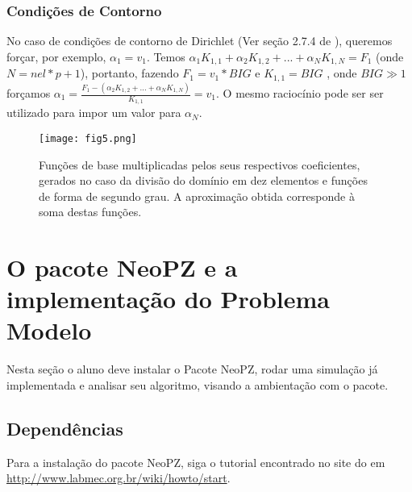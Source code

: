 \documentclass[11pt, oneside]{article}   	%
\begin{document}
\subsubsection{Condições de Contorno}
No caso de condições de contorno de Dirichlet (Ver seção 2.7.4 de \citet{oden81}), queremos forçar, por exemplo, $\alpha_{1}=v_{1}$. Temos $\alpha_{1}K_{1,1}+\alpha_{2}K_{1,2}+...+\alpha_{N}
K_{1,N}=F_{1}$ (onde $N=nel*p+1$), portanto,  fazendo $F_{1}=v_{1}*BIG$ e $K_{1,1}=BIG$ , onde $BIG\gg1$ forçamos $\alpha_{1}=\frac{F_{1}-(\alpha_{2}K_{1,2}+...+\alpha_{N}K_{1,N})}{K_{1,1}}=v_{1}$. O mesmo raciocínio pode ser ser utilizado para impor um valor para $\alpha_{N}$.
  \begin{figure}[h!]
  \centering
      \texttt{[image: fig5.png]}
  \caption{Funções de base multiplicadas pelos seus respectivos coeficientes, gerados no caso da divisão do domínio em dez elementos e funções de forma de segundo grau. A aproximação obtida corresponde à soma destas funções.}
  \label{fig:basisfunctions}
\end{figure}
\newpage
\section{O pacote NeoPZ e a implementação do Problema Modelo}
Nesta seção o aluno deve instalar o Pacote NeoPZ, rodar uma simulação já implementada e analisar seu algoritmo, visando a ambientação com o pacote.
\subsection{Dependências}
Para a instalação do pacote NeoPZ, siga o tutorial encontrado no site do \cite{website:labmec} em \url{http://www.labmec.org.br/wiki/howto/start}.
\end{document}
